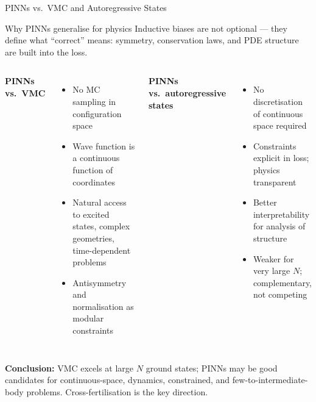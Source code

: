 \documentclass[aspectratio=169,10pt]{beamer}
\begin{document}
\begin{frame}{PINNs vs.\ VMC and Autoregressive States}
  \begin{block}{Why PINNs generalise for physics}
    Inductive biases are not optional — they define what ``correct'' means:
    symmetry, conservation laws, and PDE structure are built into the loss.
  \end{block}

  \vspace{0.3cm}
  \begin{columns}[T]
      \textbf{PINNs vs.\ VMC}
      \begin{itemize}
        \item No MC sampling in configuration space
        \item Wave function is a continuous function of coordinates
        \item Natural access to excited states, complex geometries,
              time-dependent problems
        \item Antisymmetry and normalisation as modular constraints
      \end{itemize}
      \textbf{PINNs vs.\ autoregressive states}
      \begin{itemize}
        \item No discretisation of continuous space required
        \item Constraints explicit in loss; physics transparent
        \item Better interpretability for analysis of structure
        \item Weaker for very large $N$; complementary, not competing
      \end{itemize}
  \end{columns}

  \vspace{0.3cm}
  \textbf{Conclusion:} VMC excels at large $N$ ground states;
  PINNs may be good candidates for continuous-space, dynamics, constrained, and
  few-to-intermediate-body problems.  Cross-fertilisation is the key
  direction.
\end{frame}
\end{document}
